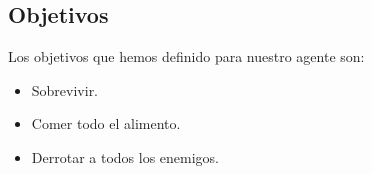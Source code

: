 \subsection{Objetivos}

Los objetivos que hemos definido para nuestro agente son:

\begin{itemize}
\item Sobrevivir.
\item Comer todo el alimento.
\item Derrotar a todos los enemigos.
\end{itemize}
